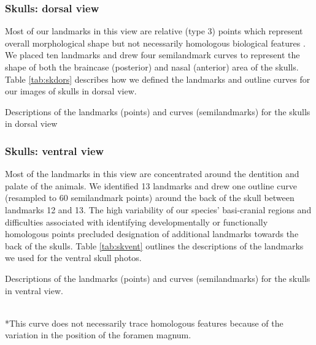 \documentclass[12pt,a4paper]{article}
\begin{document}
\subsubsection{Skulls: dorsal view}
\vspace*{-0.5cm}
	Most of our landmarks in this view are relative (type 3) points which represent overall morphological shape but not necessarily homologous biological features \citep{Zelditch2012}. We placed ten landmarks and drew four semilandmark curves to represent the shape of both the braincase (posterior) and nasal (anterior) area of the skulls. Table \ref{tab:skdors} describes how we defined the landmarks and outline curves for our images of skulls in dorsal view.

\begin{table}[h]
	\caption[Skulls: dorsal landmarks]
		{Descriptions of the landmarks (points) and curves (semilandmarks) for the skulls in dorsal view} 
	
	\label{tab:skdors}
\end{table}

\subsubsection{Skulls: ventral view}
\vspace*{-0.5cm}
	Most of the landmarks in this view are concentrated around the dentition and palate of the animals. We identified 13 landmarks and drew one outline curve (resampled to 60 semilandmark points) around the back of the skull between landmarks 12 and 13. The high variability of our species' basi-cranial regions and difficulties associated with identifying developmentally or functionally homologous points precluded designation of additional landmarks towards the back of the skulls. Table \ref{tab:skvent} outlines the descriptions of the landmarks we used for the ventral skull photos.

\begin{table}[!htb] 
\caption[Skulls: ventral landmarks]
		{Descriptions of the landmarks (points) and curves (semilandmarks) for the skulls in ventral view.} 

\label{tab:skvent}
\\
*This curve does not necessarily trace homologous features because of the variation in the position of the foramen magnum.
\end{table}
	
\end{document}
